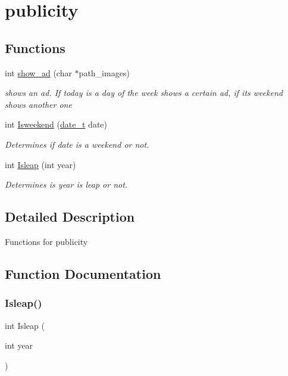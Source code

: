 \hypertarget{group__publicity}{}\section{publicity}
\label{group__publicity}
\subsection*{Functions}
\begin{DoxyCompactItemize}
\item 
int \hyperlink{group__publicity_ga7a04ef3aec214c81663352a9f4f35a65}{show\+\_\+ad} (char $\ast$path\+\_\+images)
\begin{DoxyCompactList}\small\item\em shows an ad. If today is a day of the week shows a certain ad, if it\textquotesingle{}s weekend shows another one \end{DoxyCompactList}\item 
int \hyperlink{group__publicity_ga7bad5577543cdab533e3bc88669cd691}{Isweekend} (\hyperlink{structdate__t}{date\+\_\+t} date)
\begin{DoxyCompactList}\small\item\em Determines if date is a weekend or not. \end{DoxyCompactList}\item 
int \hyperlink{group__publicity_ga2ff0d1265d48a43111f38f357dd1f874}{Isleap} (int year)
\begin{DoxyCompactList}\small\item\em Determines is year is leap or not. \end{DoxyCompactList}\end{DoxyCompactItemize}


\subsection{Detailed Description}
Functions for publicity 

\subsection{Function Documentation}
\hypertarget{group__publicity_ga2ff0d1265d48a43111f38f357dd1f874}{}\label{group__publicity_ga2ff0d1265d48a43111f38f357dd1f874} 
\subsubsection{\texorpdfstring{Isleap()}{Isleap()}}
{\footnotesize\ttfamily int Isleap (\begin{DoxyParamCaption}\item[{int}]{year }\end{DoxyParamCaption})}



